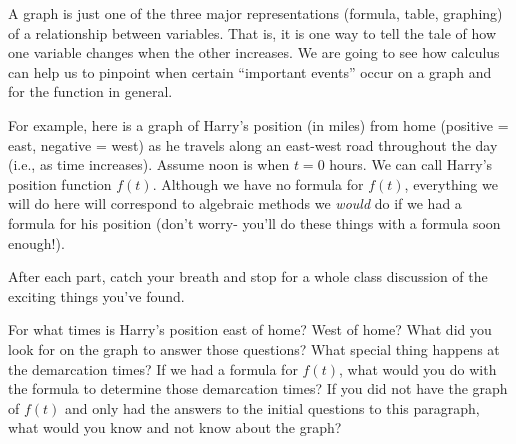 \documentclass{ximera}
\begin{document}
A graph is just one of the three major representations (formula, table, graphing) of a relationship between variables.  That is, it is one way to tell the tale of how one variable changes when the other increases.  We are going to see how calculus can help us to pinpoint when certain ``important events'' occur on a graph and for the function in general.

For example, here is a graph of Harry's position (in miles) from home (positive = east, negative = west) as he travels along an east-west road throughout the day (i.e., as time increases).  Assume noon is when $t = 0$ hours.  We can call Harry's position function $f(t)$. Although we have no formula for $f(t)$, everything we will do here will correspond to algebraic methods we {\em would} do if we had a formula for his position (don't worry- you'll do these things with a formula soon enough!). 

        After each part, catch your breath and stop for a whole class discussion of the exciting things you've found.

\begin{image}
\end{image}


\begin{exploration}
For what times is Harry's position east of home?  West of home?  What did you look for on the graph to answer those questions?  What special thing happens at the demarcation times?  If we had a formula for $f(t)$, what would you do with the formula to determine those demarcation times?  If you did not have the graph of $f(t)$ and only had the answers to the initial questions to this paragraph, what would you know and not know about the graph?

\end{exploration}
\end{document}
